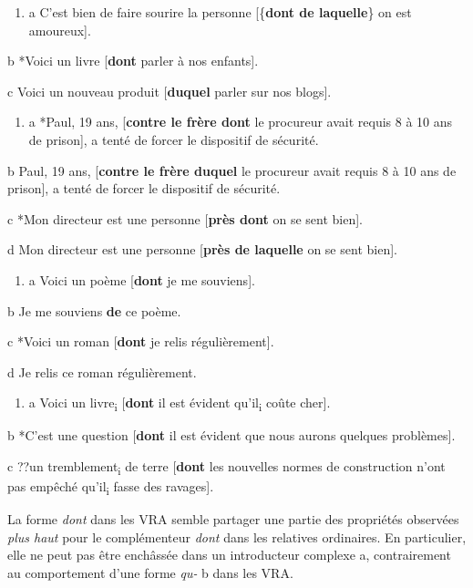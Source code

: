 \begin{enumerate}
\item \label{bkm:Ref292871616}a  C'est bien de faire sourire la personne [\{\textbf{dont {\textbar} de laquelle}\} on est amoureux].


\end{enumerate}
  b  *Voici un livre [\textbf{dont} parler à nos enfants].

  c  Voici un nouveau produit [\textbf{duquel} parler sur nos blogs].


\begin{enumerate}
\item \label{bkm:Ref292874282}a  *Paul, 19 ans, [\textbf{contre le frère dont} le procureur avait requis 8 à 10 ans de prison], a tenté de forcer le dispositif de sécurité.


\end{enumerate}
  b  Paul, 19 ans, [\textbf{contre le frère duquel} le procureur avait requis 8 à 10 ans de prison], a tenté de forcer le dispositif de sécurité.

  c  *Mon directeur est une personne [\textbf{près dont} on se sent bien].

  d  Mon directeur est une personne [\textbf{près de laquelle} on se sent bien].


\begin{enumerate}
\item \label{bkm:Ref292876063}a  Voici un poème [\textbf{dont} je me souviens].


\end{enumerate}
  b  Je me souviens \textbf{de} ce poème.

  c  *Voici un roman [\textbf{dont} je relis régulièrement].

  d  Je relis ce roman régulièrement.


\begin{enumerate}
\item \label{bkm:Ref292876147}a  Voici un livre\textsubscript{i} [\textbf{dont} il est évident qu'il\textsubscript{i} coûte cher].


\end{enumerate}
  b  *C'est une question [\textbf{dont} il est évident que nous aurons quelques problèmes].

  c  ??un tremblement\textsubscript{i} de terre [\textbf{dont} les nouvelles normes de construction n'ont pas empêché qu'il\textsubscript{i} fasse des ravages]. 

La forme \textit{dont} dans les VRA semble partager une partie des propriétés observées \textit{plus haut} pour le complémenteur \textit{dont} dans les relatives ordinaires. En particulier, elle ne peut pas être enchâssée dans un introducteur complexe a, contrairement au comportement d'une forme \textit{qu-} b dans les VRA.


